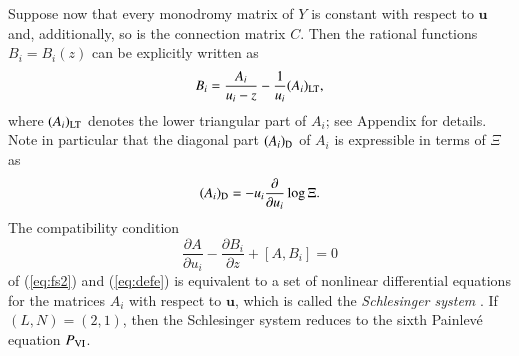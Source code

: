 \documentclass[12pt]{article}
\numberwithin{equation}{section}
\begin{document}
Suppose now that every monodromy matrix
of $Y$ 
is constant with respect to $\boldsymbol u$ and, additionally, 
so is the connection matrix $C$. 
Then
the rational functions $B_i=B_i(z)$
can be explicitly written as 
\begin{equation} \label{eq:bi}
B_i=\frac{A_i}{u_i-z}-\frac{1}{u_i}
(A_i)_{\rm LT},
\end{equation}
where
$(A_i)_{\rm LT}$ denotes the lower triangular part
of $A_i$;
see Appendix for details.
Note in particular that the diagonal part 
$(A_i)_{\rm D}$ of $A_i$ 
is expressible in terms of 
$\Xi$ as
\begin{equation} \label{eq:Aid}
(A_i)_{\rm D}= - u_i \frac{\partial}{\partial u_i}
\log \Xi.
\end{equation}
The compatibility condition
\[\frac{\partial A}{\partial u_i} -\frac{\partial B_i}{\partial z}+[A,B_i]=0
\]
 of  
 (\ref{eq:fs2}) and (\ref{eq:defe})
 is equivalent to a set of nonlinear differential equations for 
 the matrices
 $A_i$
with respect to ${\boldsymbol u}$,
which is called  
the {\it Schlesinger system}
\cite{sch12}.
If $(L,N)=(2,1)$,
then the Schlesinger system reduces to the sixth Painlev\'e equation
$P_{\rm VI}$.
\end{document}
